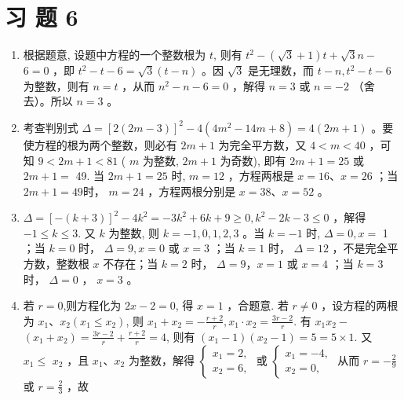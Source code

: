 \documentclass[10pt]{article}
\begin{document}
\section*{习 题 6}
\begin{enumerate}
  \item 根据题意, 设题中方程的一个整数根为 $t$, 则有 $t^{2}-(\sqrt{3}+1) t+\sqrt{3} n-$ $6=0$ ，即 $t^{2}-t-6=\sqrt{3}(t-n)$ 。因 $\sqrt{3}$ 是无理数，而 $t-n, t^{2}-t-6$ 为整数，则有 $n=t$ ，从而 $n^{2}-n-6=0$ ，解得 $n=3$ 或 $n=-2$ （舍去）。所以 $n=3$ 。
  \item 考查判别式 $\Delta=[2(2 m-3)]^{2}-4\left(4 m^{2}-14 m+8\right)=4(2 m+1)$ 。要使方程的根为两个整数，则必有 $2 m+1$ 为完全平方数，又 $4<m<40$ ，可知 $9<2 m+1<81$ ( $m$ 为整数, $2 m+1$ 为奇数), 即有 $2 m+1=25$ 或 $2 m+1=$ 49. 当 $2 m+1=25$ 时, $m=12$ ，方程两根是 $x=16 、 x=26$ ；当 $2 m+1=49$时， $m=24$ ，方程两根分别是 $x=38 、 x=52$ 。
  \item $\Delta=[-(k+3)]^{2}-4 k^{2}=-3 k^{2}+6 k+9 \geqslant 0, k^{2}-2 k-3 \leqslant 0$ ，解得 $-1 \leqslant k \leqslant 3$. 又 $k$ 为整数, 则 $k=-1,0,1,2,3$ 。当 $k=-1$ 时, $\Delta=0, x=$ 1 ；当 $k=0$ 时， $\Delta=9, x=0$ 或 $x=3$ ；当 $k=1$ 时， $\Delta=12$ ，不是完全平方数，整数根 $x$ 不存在；当 $k=2$ 时， $\Delta=9 ， x=1$ 或 $x=4$ ；当 $k=3$ 时， $\Delta=0$ ， $x=3$ 。
  \item 若 $r=0$,则方程化为 $2 x-2=0$, 得 $x=1$ ，合题意. 若 $r \neq 0$ ，设方程的两根为 $x_{1} 、 x_{2}\left(x_{1} \leqslant x_{2}\right)$, 则 $x_{1}+x_{2}=-\frac{r+2}{r}, x_{1} \cdot x_{2}=\frac{3 r-2}{r}$. 有 $x_{1} x_{2}-$ $\left(x_{1}+x_{2}\right)=\frac{3 r-2}{r}+\frac{r+2}{r}=4$, 则有 $\left(x_{1}-1\right)\left(x_{2}-1\right)=5=5 \times 1$. 又 $x_{1} \leqslant$ $x_{2}$ ，且 $x_{1} 、 x_{2}$ 为整数，解得 $\left\{\begin{array}{l}x_{1}=2, \\ x_{2}=6,\end{array}\right.$ 或 $\left\{\begin{array}{l}x_{1}=-4, \\ x_{2}=0,\end{array}\right.$ 从而 $r=-\frac{2}{9}$ 或 $r=\frac{2}{3}$ ，故
\end{enumerate}
\end{document}
